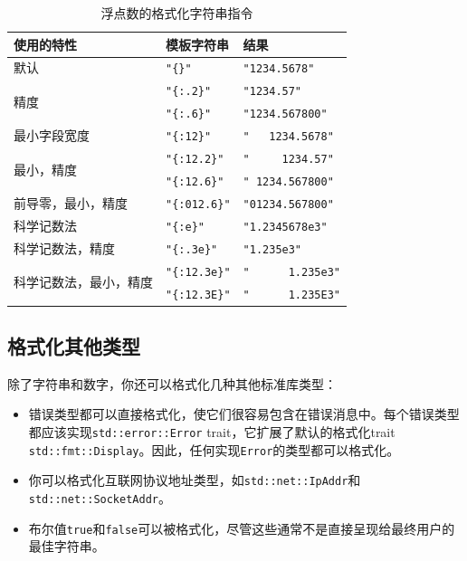 \begin{longtable}{p{}p{}p{}}
    \caption{浮点数的格式化字符串指令}
    \label{t17-7}\\
    \hline
    \textbf{使用的特性} & \textbf{模板字符串} & \textbf{结果} \\
    \hline
    默认 & \texttt{"\{\}"} & \texttt{"1234.5678"} \\
    \hline

    \multirow{2}{*}{精度} & \texttt{"\{:.2\}"} \cellcolor{tablecolor} & \texttt{"1234.57"} \cellcolor{tablecolor} \\
    & \texttt{"\{:.6\}"} & \texttt{"1234.567800"} \\
    \hline
    最小字段宽度 & \texttt{"\{:12\}"} & \texttt{"\ \ \ 1234.5678"} \\
    \hline

    \multirow{2}{*}{最小，精度} & \texttt{"\{:12.2\}"} \cellcolor{tablecolor} & \texttt{"\ \ \ \ \ 1234.57"} \cellcolor{tablecolor} \\
    & \texttt{"\{:12.6\}"} & \texttt{"\ 1234.567800"} \\
    \hline
    前导零，最小，精度 & \texttt{"\{:012.6\}"} & \texttt{"01234.567800"} \\
    \hline

    科学记数法 & \texttt{"\{:e\}"} \cellcolor{tablecolor} & \texttt{"1.2345678e3"} \cellcolor{tablecolor} \\
    \hline
    科学记数法，精度 & \texttt{"\{:.3e\}"} & \texttt{"1.235e3"} \\
    \hline

    \multirow{2}{*}{科学记数法，最小，精度} & \texttt{"\{:12.3e\}"} \cellcolor{tablecolor} & \texttt{"\ \ \ \ \ \ 1.235e3"} \cellcolor{tablecolor} \\
    & \texttt{"\{:12.3E\}"} & \texttt{"\ \ \ \ \ \ 1.235E3"} \\
    \hline
\end{longtable}

\subsection{格式化其他类型}

除了字符串和数字，你还可以格式化几种其他标准库类型：
\begin{itemize}
    \item 错误类型都可以直接格式化，使它们很容易包含在错误消息中。每个错误类型都应该实现\texttt{std::error::Error} trait，它扩展了默认的格式化trait \texttt{std::fmt::Display}。因此，任何实现\texttt{Error}的类型都可以格式化。
    \item 你可以格式化互联网协议地址类型，如\texttt{std::net::IpAddr}和\texttt{std::net::SocketAddr}。
    \item 布尔值\texttt{true}和\texttt{false}可以被格式化，尽管这些通常不是直接呈现给最终用户的最佳字符串。
\end{itemize}

